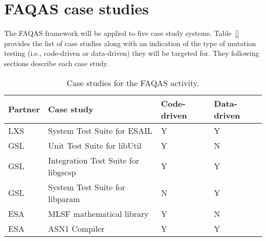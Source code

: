 
\chapter{FAQAS case studies}
\label{chapter:caseStudies}

The FAQAS framework will be applied to five case study systems. Table~\ref{} provides the list of case studies along with an indication of the type of mutation testing (i.e., code-driven or data-driven) they will be targeted for. They following sections describe each case study.

\begin{table}[htp]
\caption{Case studies for the FAQAS activity.}
\label{tab:caseStudies}
\begin{center}
\begin{tabular}{|p{1cm}|p{6cm}|p{2.5cm}|p{2.5cm}}
\hline
\textbf{Partner}&\textbf{Case study}&\textbf{Code-driven}&\textbf{Data-driven}\\
\hline
LXS&System Test Suite for ESAIL&Y&Y\\
GSL&Unit Test Suite for libUtil&Y&N\\
GSL&Integration Test Suite for libgscsp&Y&Y\\
GSL&System Test Suite for libparam&N&Y\\
ESA&MLSF mathematical library&Y&N\\
ESA&ASN1 Compiler&Y&Y\\
\hline
\end{tabular}
\end{center}
\end{table}%

\clearpage










